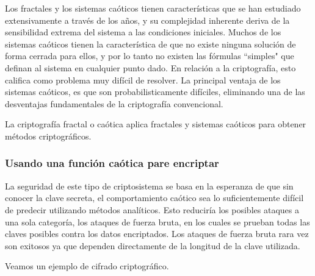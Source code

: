 Los fractales y los sistemas caóticos tienen características que se han estudiado extensivamente a través de los años, y su complejidad inherente deriva de la sensibilidad extrema del sistema a las condiciones iniciales. Muchos de los sistemas caóticos tienen la característica de que no existe ninguna solución de forma cerrada para ellos, y por lo tanto no existen las fórmulas ``simples" que definan al sistema en cualquier punto dado. En relación a la criptografía, esto califica como problema muy difícil de resolver. La principal ventaja de los sistemas caóticos, es que son probabilisticamente difíciles, eliminando una de las desventajas fundamentales de la criptografía convencional.

\begin{definition}
La criptografía fractal o caótica aplica fractales y sistemas caóticos para obtener métodos criptográficos.
\end{definition}

\subsubsection{Usando una función caótica pare encriptar}
La seguridad de este tipo de criptosistema se basa en la esperanza de que sin conocer la clave secreta, el comportamiento caótico sea lo suficientemente difícil de predecir utilizando métodos analíticos. Esto reduciría los posibles ataques a una sola categoría, los ataques de fuerza bruta, en los cuales se prueban todas las claves posibles contra los datos encriptados. Los ataques de fuerza bruta rara vez son exitosos ya que dependen directamente de la longitud de la clave utilizada.

Veamos un ejemplo de cifrado criptográfico.

